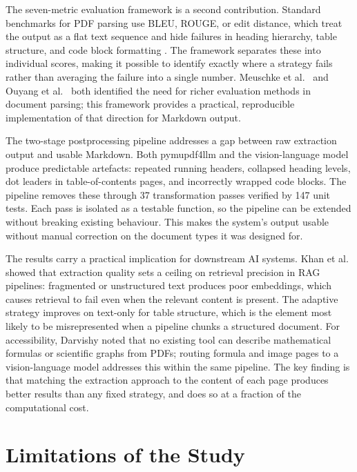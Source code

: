 The seven-metric evaluation framework is a second contribution. Standard
benchmarks for PDF parsing use BLEU, ROUGE, or edit distance, which treat the
output as a flat text sequence and hide failures in heading hierarchy, table
structure, and code block formatting \autocite{papineni2002}. The framework
separates these into individual scores, making it possible to identify exactly
where a strategy fails rather than averaging the failure into a single number.
Meuschke et al.\ \autocite{meuschke2023} and Ouyang et al.\
\autocite{omnidocbench2025} both identified the need for richer evaluation methods
in document parsing; this framework provides a practical, reproducible
implementation of that direction for Markdown output.

The two-stage postprocessing pipeline addresses a gap between raw extraction
output and usable Markdown. Both pymupdf4llm and the vision-language model produce
predictable artefacts: repeated running headers, collapsed heading levels, dot
leaders in table-of-contents pages, and incorrectly wrapped code blocks. The
pipeline removes these through 37 transformation passes verified by 147 unit
tests. Each pass is isolated as a testable function, so the pipeline can be
extended without breaking existing behaviour. This makes the system's output
usable without manual correction on the document types it was designed for.

The results carry a practical implication for downstream AI systems. Khan et al.\
\autocite{khan2024} showed that extraction quality sets a ceiling on retrieval
precision in RAG pipelines: fragmented or unstructured text produces poor
embeddings, which causes retrieval to fail even when the relevant content is
present. The adaptive strategy improves on text-only for table structure, which
is the element most likely to be misrepresented when a pipeline chunks a
structured document. For accessibility, Darvishy \autocite{darvishy2018} noted
that no existing tool can describe mathematical formulas or scientific graphs from
PDFs; routing formula and image pages to a vision-language model addresses this
within the same pipeline. The key finding is that matching the extraction approach
to the content of each page produces better results than any fixed strategy, and
does so at a fraction of the computational cost.

\section{Limitations of the Study}

